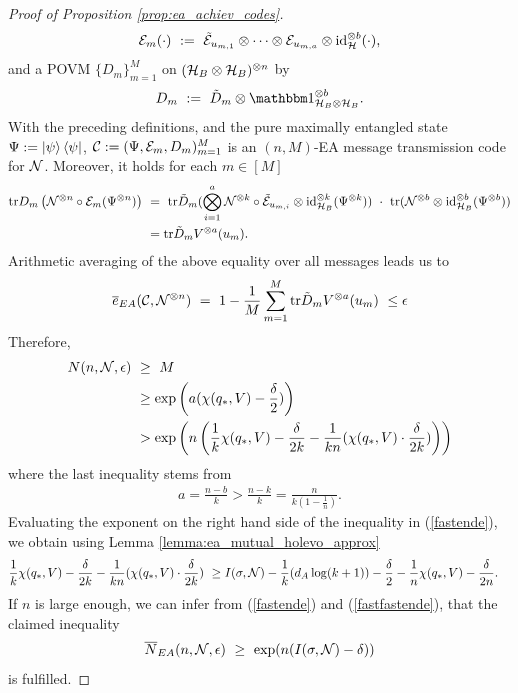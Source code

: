 \begin{proof}[Proof of Proposition \ref{prop:ea_achiev_codes}]
\begin{align*}
{\mathcal E}_m(\cdot) \ := \ \tilde{{\mathcal E}}_{u_{m,1}} \otimes \cdots \otimes {\mathcal E}_{u_{m,a}} \otimes \mathrm{id}_{{\mathcal H}}^{\otimes b}(\cdot),
\end{align*}
and a POVM $\{D_m\}_{m =1}^M$ on $({\mathcal H}_B \otimes {\mathcal H}_B)^{\otimes n}$ by 
\begin{align*}
D_m \ := \ \tilde{D}_m \otimes \bbmeins_{\cH_B \otimes \cH_B}^{\otimes b}.
\end{align*}
With the preceding definitions, and the pure maximally entangled state $\Psi := \ket{\psi}\bra{\psi}$, ${\mathcal C} := (\Psi,{\mathcal E}_m,D_m)_{m=1}^M$ is an $(n,M)$-EA message transmission code for ${\mathcal N}$. Moreover, it holds for each $m \in [M]$
\begin{align*}
 \tr D_m\left(\cN^{\otimes n} \circ \cE_m(\Psi^{\otimes n})\right) \ 
 & =\ \tr\tilde{D}_m(\bigotimes_{i=1}^a \cN^{\otimes k} \circ \tilde{\cE}_{u_{m,i}} \otimes \id_{\cH_B}^{\otimes k}(\Psi^{\otimes k})) \ \cdot \ \tr(\cN^{\otimes b}\otimes \id_{\cH_B}^{\otimes b}(\Psi^{\otimes b}))\\ 
 & = \tr \tilde{D}_m V^{\otimes a}(u_m).
 \end{align*}
 Arithmetic averaging of the above equality over all messages leads us to
 \begin{align*}
 \overline{e}_{EA}({\mathcal C}, {\mathcal N}^{\otimes n}) \ = \ 1 - \frac{1}{M} \sum_{m=1}^M \mathrm{tr} \tilde{D}_m V^{\otimes a}(u_m) \ \leq \epsilon
 \end{align*}
 Therefore, 
 \begin{align}
 N(n, \cN, \epsilon) \ 
 & \geq \ M \nonumber \\
 &\geq \exp\left(a (\chi(q_\ast,V)-\frac{\delta}{2})\right) \nonumber \\
 &> \exp\left(n \left(\frac{1}{k} \chi(q_\ast,V) - \frac{\delta}{2k} - \frac{1}{kn}(\chi(q_\ast,V)\cdot \frac{\delta}{2k})\right) \right)  \label{fastende}
\end{align}
where the last inequality stems from 
\begin{align*}
a = \frac{n-b}{k} > \frac{n-k}{k} = \frac{n}{k(1 - \frac{1}{n})}.
\end{align*}
Evaluating the exponent on the right hand side of the inequality in (\ref{fastende}), we obtain using Lemma \ref{lemma:ea_mutual_holevo_approx}
\begin{align}
\frac{1}{k} \chi(q_\ast,V) - \frac{\delta}{2k} - \frac{1}{kn}(\chi(q_\ast,V)\cdot \frac{\delta}{2k}) \ 
 & \geq I(\sigma, \cN) - \frac{1}{k}(d_A \log(k+1)) - \frac{\delta}{2} - \frac{1}{n} \chi(q_\ast,V) - \frac{\delta}{2n}. \label{fastfastende}
\end{align}
If $n$ is large enough, we can infer from (\ref{fastende}) and (\ref{fastfastende}), that the claimed 
inequality 
\begin{align*}
\overline{N}_{EA}(n,{\mathcal N}, \epsilon) \ \geq \ \exp(n(I(\sigma,{\mathcal N})- \delta))
\end{align*}
is fulfilled.
\end{proof}

